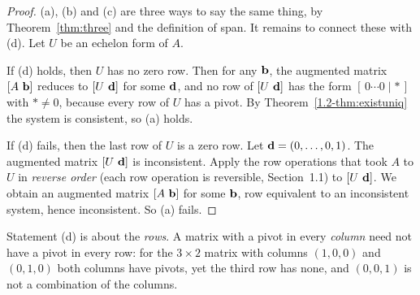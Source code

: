 \documentclass[11pt]{article}
\begin{document}
\begin{proof}
(a), (b) and (c) are three ways to say the same thing, by Theorem~\ref{thm:three} and the definition of span.
It remains to connect these with (d). Let $U$ be an echelon form of $A$.
 
If (d) holds, then $U$ has no zero row. Then for any $\mathbf{b}$, the augmented matrix $[A\ \bv{b}]$ reduces to $[U\ \mathbf{d}]$ for some $\mathbf{d}$,
and no row of $[U\ \mathbf{d}]$ has the form $[\,0\cdots0\mid\ast\,]$ with $\ast\neq0$, because every row of $U$ has a pivot.
By Theorem~\ref{1.2-thm:existuniq} the system is consistent, so (a) holds.
 
If (d) fails, then the last row of $U$ is a zero row. Let $\mathbf{d}=(0,\dots,0,1)$. The augmented matrix $[U\ \mathbf{d}]$ is inconsistent. Apply the
row operations that took $A$ to $U$ in \emph{reverse order} (each row operation is reversible, Section~1.1) to $[U\ \mathbf{d}]$. We obtain an augmented
matrix $[A\ \bv{b}]$ for some $\mathbf{b}$, row equivalent to an inconsistent system, hence inconsistent. So (a) fails.
\end{proof}
 
\begin{warn}
Statement (d) is about the \emph{rows}. A matrix with a pivot in every \emph{column} need not have a pivot in every row: for the $3\times2$ matrix
with columns $(1,0,0)$ and $(0,1,0)$ both columns have pivots, yet the third row has none, and $(0,0,1)$ is not a combination of the columns.
\end{warn}
 
\end{document}
